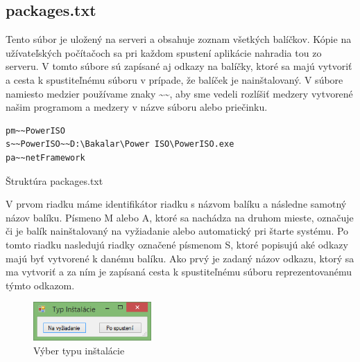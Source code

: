 \subsection{packages.txt}
Tento súbor je uložený na serveri a obsahuje zoznam všetkých balíčkov. Kópie na užívateľských počítačoch sa pri každom spustení aplikácie nahradia tou zo serveru. V tomto súbore sú zapísané aj odkazy na balíčky, ktoré sa majú vytvoriť a cesta k spustiteľnému súboru v prípade, že balíček je nainštalovaný. V súbore namiesto medzier používame znaky \textasciitilde\textasciitilde, aby sme vedeli rozlíšiť medzery vytvorené našim programom a medzery v názve súboru alebo priečinku.
\begin{listing}
\begin{verbatim}  
pm~~PowerISO
s~~PowerISO~~D:\Bakalar\Power ISO\PowerISO.exe
pa~~netFramework
\end{verbatim}
\caption{Štruktúra packages.txt}
\label{lst:pack}
\end{listing}
V prvom riadku máme identifikátor riadku s názvom balíku a následne samotný názov balíku. Písmeno M alebo A, ktoré sa nachádza na druhom mieste, označuje či je balík nainštalovaný na vyžiadanie alebo automatický pri štarte systému. Po tomto riadku nasledujú riadky označené písmenom S, ktoré popisujú aké odkazy majú byť vytvorené k danému balíku. Ako prvý je zadaný názov odkazu, ktorý sa ma vytvoriť a za ním je zapísaná cesta k spustiteľnému súboru reprezentovanému týmto odkazom.
\begin{figure}[h]
    \centering
    \includegraphics[width=0.4\textwidth]{installtype}
    \caption{Výber typu inštalácie}
    \label{fig:installtype}
\end{figure}

